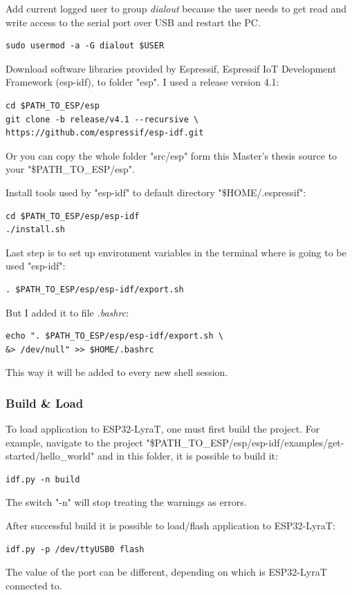 \documentclass[thesis=M,english]{FITthesis}[2019/12/23]
\begin{document}
\bigskip
\noindent
Add current logged user to group \textit{dialout} because the user needs to get read and write access to the serial port over USB and restart the PC.
\begin{lstlisting}[frame=single]
sudo usermod -a -G dialout $USER
\end{lstlisting}

\bigskip
\noindent
Download software libraries provided by Espressif, Espressif IoT Development Framework (esp-idf), to folder "esp". I used a release version 4.1:
\begin{lstlisting}[frame=single]
cd $PATH_TO_ESP/esp
git clone -b release/v4.1 --recursive \
https://github.com/espressif/esp-idf.git
\end{lstlisting}
Or you can copy the whole folder "src/esp" form this Master's thesis source to your "\$PATH\_TO\_ESP/esp".

\bigskip
\noindent
Install tools used by "esp-idf" to default directory "\$HOME/.espressif":
\begin{lstlisting}[frame=single]
cd $PATH_TO_ESP/esp/esp-idf
./install.sh
\end{lstlisting}

\bigskip
\noindent
Last step is to set up environment variables in the terminal where is going to be used "esp-idf":
\begin{lstlisting}[frame=single]
. $PATH_TO_ESP/esp/esp-idf/export.sh
\end{lstlisting}
But I added it to file \textit{.bashrc}:
\begin{lstlisting}[frame=single]
echo ". $PATH_TO_ESP/esp/esp-idf/export.sh \
&> /dev/null" >> $HOME/.bashrc
\end{lstlisting}
This way it will be added to every new shell session.

\subsubsection{Build \& Load}
To load application to ESP32-LyraT, one must first build the project. For example, navigate to the project "\$PATH\_TO\_ESP/esp/esp-idf/examples/get-started/hello\_world" and in this folder, it is possible to build it:
\begin{lstlisting}[frame=single]
idf.py -n build
\end{lstlisting}
The switch "-n" will stop treating the warnings as errors.

\bigskip
\noindent
After successful build it is possible to load/flash application to ESP32-LyraT:
\begin{lstlisting}[frame=single]
idf.py -p /dev/ttyUSB0 flash
\end{lstlisting}
The value of the port can be different, depending on which is ESP32-LyraT connected to.
\end{document}
